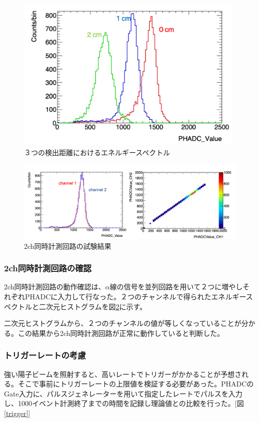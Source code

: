 \documentclass[a4paper,11pt,dvipdfmx]{jsarticle}
\begin{document}
\begin{figure}[H]
\centering
\includegraphics[width=110mm]{picture/daq/0to2cm.png}
\caption{３つの検出距離におけるエネルギースペクトル}
\label{0to2}
\end{figure}
\begin{figure}[H]
\centering
\includegraphics[width=155mm]{picture/daq/2ch.png}
\caption{2ch同時計測回路の試験結果}
\label{2ch}
\end{figure}

\subsubsection{2ch同時計測回路の確認}
2ch同時計測回路の動作確認は、$\alpha$線の信号を並列回路を用いて２つに増やしそれぞれPHADCに入力して行なった。２つのチャンネルで得られたエネルギースペクトルと二次元ヒストグラムを図\ref{2ch}に示す。

二次元ヒストグラムから、２つのチャンネルの値が等しくなっていることが分かる。この結果から2ch同時計測回路が正常に動作していると判断した。

\subsubsection{トリガーレートの考慮}
強い陽子ビームを照射すると、高いレートでトリガーがかかることが予想される。そこで事前にトリガーレートの上限値を検証する必要があった。PHADCのGate入力に、パルスジェネレーターを用いて指定したレートでパルスを入力し、1000イベント計測終了までの時間を記録し理論値との比較を行った。[図\ref{trigger}]
\end{document}
